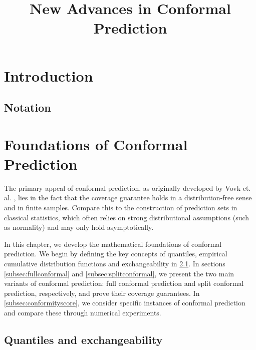 \documentclass[11pt, titlepage]{article} %
\title{New Advances in Conformal Prediction}
\numberwithin{equation}{section}
\theoremstyle{definition}
\numberwithin{theorem}{section}
\numberwithin{lemma}{section}
\numberwithin{corollary}{section}
\numberwithin{proposition}{section}
\numberwithin{definition}{section}
\numberwithin{remark}{section}
\begin{document}
\maketitle


\section{Introduction}
\subsection{Notation}





\label{sec:intro}

\section{Foundations of Conformal Prediction}
\label{sec:foundations_of_CP}

The primary appeal of conformal prediction, as originally developed by Vovk et. al. \cite{vovk2005algorithmic}, lies in the fact that the coverage guarantee holds in a distribution-free sense and in finite samples. Compare this to the construction of prediction sets in classical statistics, which often relies on strong distributional assumptions (such as normality) and may only hold asymptotically. \vskip 5pt

\noindent
In this chapter, we develop the mathematical foundations of conformal prediction. We begin by defining the key concepts of quantiles, empirical cumulative distribution functions and exchangeability in \cref{subsec:quantiles_and_exchangeability}. In sections \cref{subsec:fullconformal} and \cref{subsec:splitconformal}, we present the two main variants of conformal prediction: full conformal prediction and split conformal prediction, respectively, and prove their coverage guarantees. In \cref{subsec:conformityscore}, we consider specific instances of conformal prediction and compare these through numerical experiments.

\subsection{Quantiles and exchangeability}
\label{subsec:quantiles_and_exchangeability}
\end{document}
